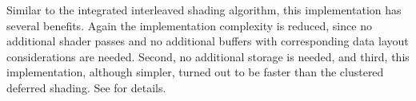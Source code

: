Similar to the integrated interleaved shading algorithm, this implementation has several benefits. Again the implementation complexity is reduced, since no additional shader passes and no additional buffers with corresponding data layout considerations are needed. Second, no additional storage is needed, and third, this implementation, although simpler, turned out to be faster than the clustered deferred shading. See  for details.
